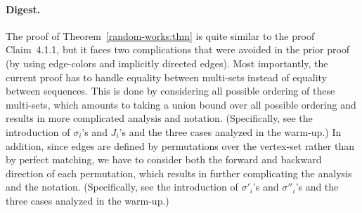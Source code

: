 \paragraph{Digest.}
The proof of Theorem~\ref{random-works:thm} is quite similar
to the proof Claim~4.1.1, but it faces
two complications that were avoided in the prior proof
(by using edge-colors and implicitly directed edges).
Most importantly, the current proof has to handle equality
between multi-sets instead of equality between sequences.
This is done by considering all possible ordering of these multi-sets,
which amounts to taking a union bound over all possible ordering
and results in more complicated analysis and notation.
(Specifically, see the introduction of $\sigma_i$'s and $J_i$'s
and the three cases analyzed in the warm-up.)
In addition, since edges are defined by permutations over the vertex-set
rather than by perfect matching, we have to consider both the forward
and backward direction of each permutation,
which results in further complicating the analysis and the notation.
(Specifically, see the introduction of $\sigma'_i$'s and $\sigma''_i$'s
and the three cases analyzed in the warm-up.)


































































